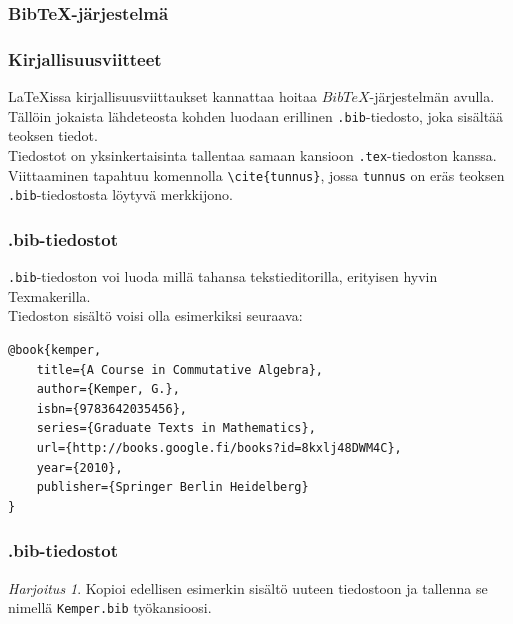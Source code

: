 \documentclass[handout,hyperref={colorlinks=true}]{beamer}
\theoremstyle{remark}
\newtheorem{harj}{Harjoitus}[section]
\newcommand{\vaihto}{\\ \vspace{10pt}}
\newcommand{\BibTeX}{BibTeX}
\begin{document}
\subsubsection{BibTeX-järjestelmä}
\begin{frame}[fragile]
    \frametitle{Kirjallisuusviitteet}
    \LaTeX issa kirjallisuusviittaukset kannattaa hoitaa \(\BibTeX\)-järjestelmän avulla. 
    \vaihto
    Tällöin jokaista lähdeteosta kohden luodaan erillinen \verb-.bib--tiedosto, joka sisältää teoksen tiedot. 
    \vaihto
    Tiedostot on yksinkertaisinta tallentaa samaan kansioon \verb-.tex--tiedoston kanssa.
    \vaihto
    Viittaaminen tapahtuu komennolla \verb-\cite{tunnus}-, jossa \verb-tunnus- on eräs teoksen \verb-.bib--tiedostosta löytyvä merkkijono.
\end{frame}
\begin{frame}[fragile]
    \frametitle{.bib-tiedostot}
    \verb-.bib--tiedoston voi luoda millä tahansa tekstieditorilla, erityisen hyvin Texmakerilla. 
    \vaihto
    Tiedoston sisältö voisi olla esimerkiksi seuraava:\vaihto
    \begin{scriptsize}
        \begin{Verbatim}[frame=single]
@book{kemper,
    title={A Course in Commutative Algebra},
    author={Kemper, G.},
    isbn={9783642035456},
    series={Graduate Texts in Mathematics},
    url={http://books.google.fi/books?id=8kxlj48DWM4C},
    year={2010},
    publisher={Springer Berlin Heidelberg}
}
        \end{Verbatim}
    \end{scriptsize}
\end{frame}
\begin{frame}[fragile]
    \frametitle{.bib-tiedostot}
    \begin{harj}
        Kopioi edellisen esimerkin sisältö uuteen tiedostoon ja tallenna se nimellä \verb-Kemper.bib- työkansioosi. 
    \end{harj}
\end{frame}
\end{document}

